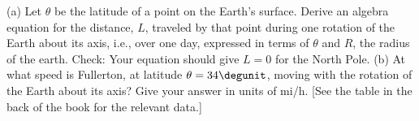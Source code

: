 (a) Let $\theta $ be the latitude of a point on the
Earth's surface.  Derive an algebra equation for the
distance, $L$, traveled by that point during one rotation of
the Earth about its axis, i.e., over one day, expressed in
terms of $\theta$ and $R$, the radius of the earth.
Check: Your equation should give $L=0$ for the North Pole.\hwendpart
(b) At what speed is Fullerton, at latitude 
$\theta=34\degunit$, moving with the rotation of the Earth about its
axis?  Give your answer in units of mi/h. [See the table in
the back of the book for the relevant data.]\answercheck
